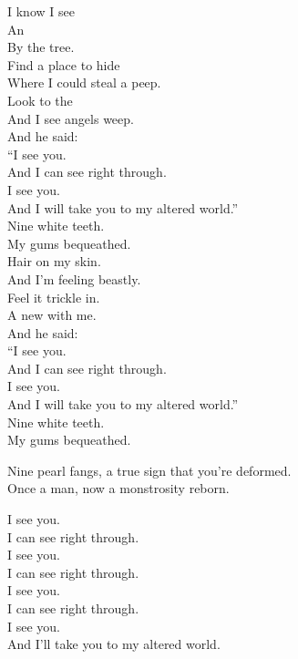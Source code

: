 



I know I see \\
An   \\
By the tree. \\

Find a place to hide \\
Where I could steal a peep. \\
Look to the  \\
And I see angels weep. \\

And he said: \\
``I see you. \\
And I can see right through. \\
I see you. \\
And I will take you to my altered world.'' \\

Nine white teeth. \\
My gums bequeathed. \\

Hair on my skin. \\
And I'm feeling beastly. \\
Feel it trickle in. \\
A new  with me. \\

And he said: \\
``I see you. \\
And I can see right through. \\
I see you. \\
And I will take you to my altered world.'' \\

Nine white teeth. \\
My gums bequeathed. \\


Nine pearl fangs, a true sign that you're deformed. \\
Once a man, now a monstrosity reborn. \\


I see you. \\
I can see right through. \\
I see you. \\
I can see right through. \\
I see you. \\
I can see right through. \\
I see you. \\
And I'll take you to my altered world. \\

